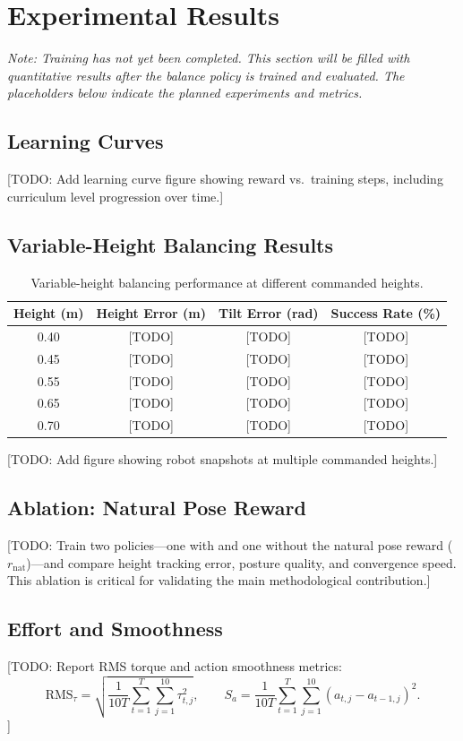 \documentclass[conference]{IEEEtran}
\begin{document}
\section{Experimental Results}
\label{sec:results}

\textit{Note: Training has not yet been completed. This section will be filled with quantitative results after the balance policy is trained and evaluated. The placeholders below indicate the planned experiments and metrics.}

\subsection{Learning Curves}
[TODO: Add learning curve figure showing reward vs.\ training steps, including curriculum level progression over time.]

\subsection{Variable-Height Balancing Results}
\begin{table}[ht]
\centering
\caption{Variable-height balancing performance at different commanded heights.}
\label{tab:balance_results}
\begin{tabular}{c c c c}
\toprule
Height (m) & Height Error (m) & Tilt Error (rad) & Success Rate (\%) \\
\midrule
0.40 & [TODO] & [TODO] & [TODO] \\
0.45 & [TODO] & [TODO] & [TODO] \\
0.55 & [TODO] & [TODO] & [TODO] \\
0.65 & [TODO] & [TODO] & [TODO] \\
0.70 & [TODO] & [TODO] & [TODO] \\
\bottomrule
\end{tabular}
\end{table}

[TODO: Add figure showing robot snapshots at multiple commanded heights.]

\subsection{Ablation: Natural Pose Reward}
[TODO: Train two policies---one with and one without the natural pose reward ($r_{\mathrm{nat}}$)---and compare height tracking error, posture quality, and convergence speed. This ablation is critical for validating the main methodological contribution.]

\subsection{Effort and Smoothness}
[TODO: Report RMS torque and action smoothness metrics:
\begin{equation}
\mathrm{RMS}_{\tau}=
\sqrt{
\frac{1}{10T}
\sum_{t=1}^{T}
\sum_{j=1}^{10}
\tau_{t,j}^2
},
\qquad
S_{a}=
\frac{1}{10T}
\sum_{t=1}^{T}
\sum_{j=1}^{10}
(a_{t,j}-a_{t-1,j})^2.
\end{equation}
]
\end{document}
